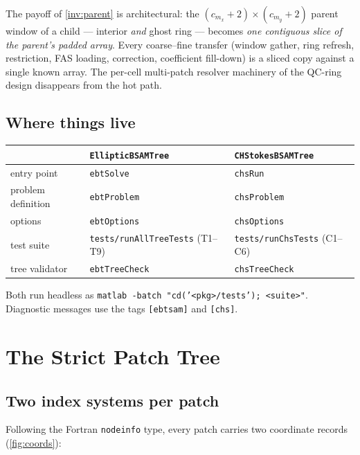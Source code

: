 \documentclass[11pt,oneside,openany]{book}
\newcommand{\code}[1]{\textnormal{\texttt{#1}}}
\begin{document}
\begin{keyidea}
The payoff of \cref{inv:parent} is architectural: the $(c_{m_x}{+}2)
\times (c_{m_y}{+}2)$ parent window of a child --- interior
\emph{and} ghost ring --- becomes \emph{one contiguous slice of the
parent's padded array}.  Every coarse--fine transfer (window gather,
ring refresh, restriction, FAS loading, correction, coefficient
fill-down) is a sliced copy against a single known array.  The per-cell
multi-patch resolver machinery of the QC-ring design disappears from
the hot path.
\end{keyidea}

\section{Where things live}

\begin{center}\small
\begin{tabular}{@{}lll@{}}
\toprule
 & \code{EllipticBSAMTree} & \code{CHStokesBSAMTree} \\
\midrule
entry point & \code{ebtSolve} & \code{chsRun} \\
problem definition & \code{ebtProblem} & \code{chsProblem} \\
options & \code{ebtOptions} & \code{chsOptions} \\
test suite & \code{tests/runAllTreeTests} (T1--T9) & \code{tests/runChsTests} (C1--C6) \\
tree validator & \code{ebtTreeCheck} & \code{chsTreeCheck} \\
\bottomrule
\end{tabular}
\end{center}

Both run headless as
\code{matlab -batch "cd('<pkg>/tests'); <suite>"}.  Diagnostic messages
use the tags \code{[ebtsam]} and \code{[chs]}.

\chapter{The Strict Patch Tree}
\label{ch:tree}

\section{Two index systems per patch}
\label{sec:indexsystems}

Following the Fortran \code{nodeinfo} type, every patch carries two
coordinate records (\cref{fig:coords}):
\end{document}
